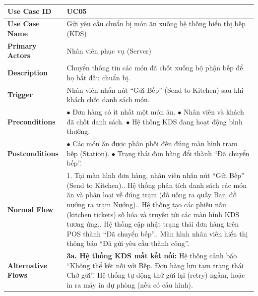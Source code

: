\begin{longtable}{|p{3.5cm}|p{12.5cm}|}
\hline
\textbf{Use Case ID} & UC05 \\ \hline
\textbf{Use Case Name} & Gửi yêu cầu chuẩn bị món ăn xuống hệ thống hiển thị bếp (KDS) \\ \hline
\textbf{Primary Actors} & Nhân viên phục vụ (Server) \\ \hline
\textbf{Description} & Chuyển thông tin các món đã chốt xuống bộ phận bếp để họ bắt đầu chuẩn bị. \\ \hline
\textbf{Trigger} & Nhân viên nhấn nút ``Gửi Bếp'' (Send to Kitchen) sau khi khách chốt danh sách món. \\ \hline
\textbf{Preconditions} &
$\bullet$ Đơn hàng có ít nhất một món ăn.\newline
$\bullet$ Nhân viên và khách đã chốt danh sách.\newline
$\bullet$ Hệ thống KDS đang hoạt động bình thường. \\ \hline
\textbf{Postconditions} &
$\bullet$ Các món ăn được phân phối đến đúng màn hình trạm bếp (Station).\newline
$\bullet$ Trạng thái đơn hàng đổi thành ``Đã chuyển bếp''. \\ \hline
\textbf{Normal Flow} &
1. Tại màn hình đơn hàng, nhân viên nhấn nút ``Gửi Bếp'' (Send to Kitchen).\newline
2. Hệ thống phân tích danh sách các món ăn và phân loại về đúng trạm (đồ uống ra quầy Bar, đồ nướng ra trạm Nướng).\newline
3. Hệ thống tạo các phiếu nấu (kitchen tickets) số hóa và truyền tới các màn hình KDS tương ứng.\newline
4. Hệ thống cập nhật trạng thái đơn hàng trên POS thành ``Đã chuyển bếp''.\newline
5. Màn hình nhân viên hiển thị thông báo ``Đã gửi yêu cầu thành công''. \\ \hline
\textbf{Alternative Flows} &
\textbf{3a. Hệ thống KDS mất kết nối:} Hệ thống cảnh báo ``Không thể kết nối với Bếp. Đơn hàng lưu tạm trạng thái Chờ gửi''. Hệ thống tự động thử gửi lại (retry) ngầm, hoặc in ra máy in dự phòng (nếu có cấu hình). \\ \hline
\end{longtable}

